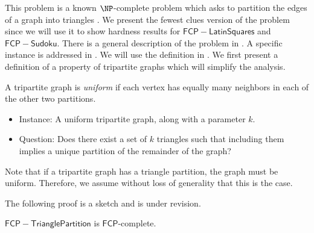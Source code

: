 \documentclass[runningheads,a4paper]{llncs}
\begin{document}
This problem is a known $\NP$-complete problem which asks to partition the edges of a graph into triangles \cite{holyer1981np}. We present the fewest clues version of the problem since we will use it to show hardness results for $\mathsf{FCP-Latin Squares}$ and $\mathsf{FCP-Sudoku}$. There is a general description of the problem in \cite{holyer1981np}. A specific instance is addressed in \cite{colbourn1984complexity}. We will use the definition in \cite{colbourn1984complexity}. We first present a definition of a property of tripartite graphs which will simplify the analysis.

\begin{definition}
A tripartite graph is \emph{uniform} if each vertex has equally many neighbors in each of the other two partitions.
\end{definition}

\begin{itemize}
\item Instance: A uniform tripartite graph, along with a parameter $k$.
\item Question: Does there exist a set of $k$ triangles such that including them implies a unique partition of the remainder of the graph?
\end{itemize}

Note that if a tripartite graph has a triangle partition, the graph must be uniform. Therefore, we assume without loss of generality that this is the case. 

The following proof is a sketch and is under revision.

\begin{theorem}
$\mathsf{FCP-Triangle Partition}$ is $\mathsf{FCP}$-complete.
\end{theorem}
\end{document}
